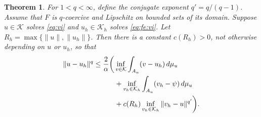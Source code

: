 \documentclass[]{interact}
\theoremstyle{plain}%
\newtheorem{theorem}{Theorem}[section]
\theoremstyle{definition}
\theoremstyle{remark}
\newcommand{\cK}{\mathcal{K}}
\begin{document}
\begin{theorem} \label{thm:genfalk}  For $1<q<\infty$, define the conjugate exponent $q'=q/(q-1)$.  Assume that $F$ is $q$-coercive and Lipschitz on bounded sets of its domain.  Suppose $u\in\cK$ solves \eqref{eq:vi} and $u_h\in\cK_h$ solves \eqref{eq:fe:vi}.  Let $R_h=\max\{\|u\|,\|u_h\|\}$.  Then there is a constant $c(R_h)>0$, not otherwise depending on $u$ or $u_h$, so that
\begin{align}
\|u-u_h\|^q &\le \frac{2}{\alpha} \bigg( \inf_{v\in\cK} \int_{A_u} (v-u_h)\,d\mu_u \label{eq:falk} \\
   &\qquad\quad + \inf_{v_h\in\cK_h} \int_{A_u} (v_h-\psi)\,d\mu_u \notag \\
   &\qquad\quad + c(R_h) \inf_{v_h\in\cK_h} \|v_h - u\|^{q'}\bigg). \notag
\end{align}
\end{theorem}
\end{document}
